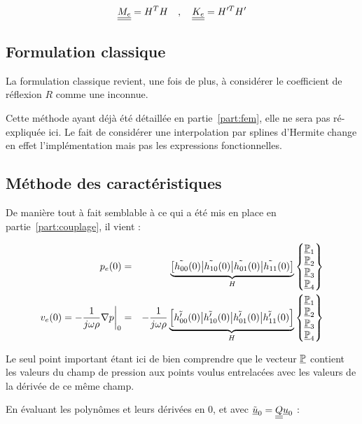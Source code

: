 \begin{equation*}
	\underline{\underline{M_e}} = H^TH \quad,\quad \underline{\underline{K_e}} = H'^TH'
\end{equation*}

\subsection{Formulation classique}

La formulation classique revient, une fois de plus, à considérer le coefficient de réflexion $R$ comme une inconnue.

Cette méthode ayant déjà été détaillée en partie~\ref{part:fem}, elle ne sera pas ré-expliquée ici. Le fait de
considérer une interpolation par splines d'Hermite change en effet l'implémentation mais pas les expressions
fonctionnelles.

\subsection{Méthode des caractéristiques}

De manière tout à fait semblable à ce qui a été mis en place en partie~\ref{part:couplage}, il vient :

\begin{eqnarray*}
	p_e(0) & = & \underbrace{\left[\tilde{h_{00}}(0)\big|\tilde{h_{10}}(0)\big|\tilde{h_{01}}(0)\big|\tilde{h_{11}}(0)\right]}_{H}\begin{Bmatrix}\underline{\mathbb{P}}_1\\\underline{\mathbb{P}}_2\\\underline{\mathbb{P}}_3\\\underline{\mathbb{P}}_4\end{Bmatrix}\\
	v_e(0) = -\frac{1}{j\omega\rho}\nabla p\bigg|_0& = & -\frac{1}{j\omega\rho}\underbrace{\left[\tilde{h'_{00}}(0)\big|\tilde{h'_{10}}(0)\big|\tilde{h'_{01}}(0)\big|\tilde{h'_{11}}(0)\right]}_{H}\begin{Bmatrix}\underline{\mathbb{P}}_1\\\underline{\mathbb{P}}_2\\\underline{\mathbb{P}}_3\\\underline{\mathbb{P}}_4\end{Bmatrix}
\end{eqnarray*}

Le seul point important étant ici de bien comprendre que le vecteur $\underline{\mathbb{P}}$ contient les valeurs du champ de pression
aux points voulus entrelacées avec les valeurs de la dérivée de ce même champ.

En évaluant les polynômes et leurs dérivées en $0$, et avec $\tilde{\underline{u}}_0 = \underline{\underline{Q}}\underline{u}_0$ :


